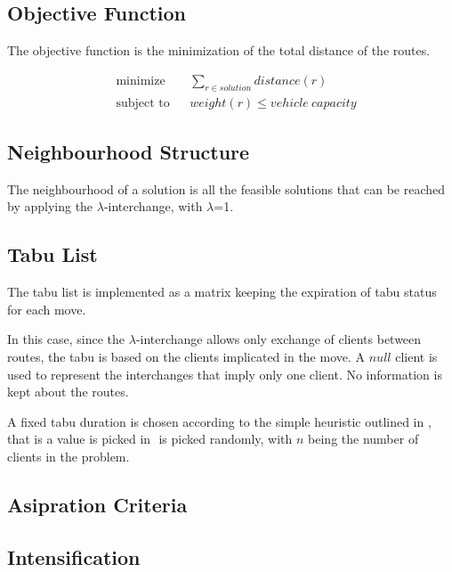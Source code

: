 \documentclass{article} %
\begin{document}
\subsection{Objective Function}

The objective function is the minimization of the total distance of the routes.

\begin{equation*}
\begin{aligned}
& \text{minimize}
& & \sum\limits_{r \in solution} distance(r) \\
& \text{subject to}
& & weight(r) \leq vehicle\ capacity
\end{aligned}
\end{equation*}


\subsection{Neighbourhood Structure}

The neighbourhood of a solution is all the feasible solutions that can be reached by applying the $\lambda$-interchange, with $\lambda$=1.


\subsection{Tabu List}

The tabu list is implemented as a matrix keeping the expiration of tabu status for each move.

In this case, since the $\lambda$-interchange allows only exchange of clients between routes, the tabu is based on the clients implicated in the move. A $null$ client is used to represent the interchanges that imply only one client. No information is kept about the routes.\newline

A fixed tabu duration is chosen according to the simple heuristic outlined in \citep{osman1993}, that is a value is picked in \begin{math} [0.4n,\ 0.6n] \end{math} is picked randomly, with $n$ being the number of clients in the problem. 


\subsection{Asipration Criteria}



\subsection{Intensification}
\end{document}

